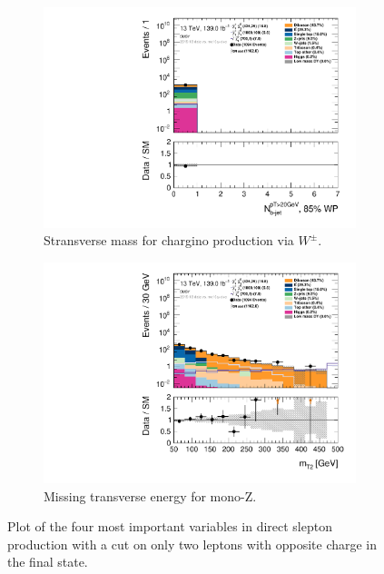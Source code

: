\begin{figure}[H]
    \\
    \begin{subfigure}[t!]{0.49\textwidth}
        \includegraphics[width=\textwidth]{Figures/SUSYcuts/hist1d_nBJet20_MV2c10_FixedCutBEff_85_SUSY.pdf}
    \caption{Stransverse mass for chargino production via $W^\pm$.}
    \label{fig:my_label}
    \end{subfigure}
    \begin{subfigure}[t!]{0.49\textwidth}
        \includegraphics[width=\textwidth]{Figures/SUSYcuts/hist1d_mt2_SUSY.pdf}
    \caption{Missing transverse energy for mono-Z.}
    \label{fig:my_label}
    \end{subfigure}
    \caption{Plot of the four most important variables in direct slepton production with a cut on only two leptons with opposite charge in the final state.}
    \label{fig:cutandcountStepsSUSY}
\end{figure}
\restoregeometry



















